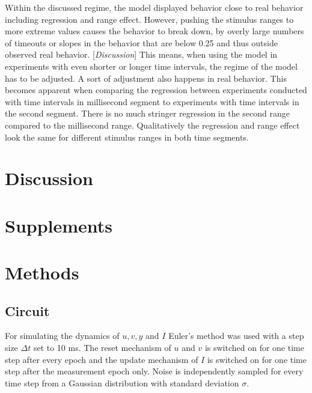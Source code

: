 \documentclass[10pt]{article}
\begin{document}
Within the discussed regime, the model displayed behavior close to real behavior including regression and range effect. However, pushing the stimulus ranges to more extreme values causes the behavior to break down, by overly large numbers of timeouts or slopes in the behavior that are below 0.25 and thus outside observed real behavior. 
[\textit{Discussion}] This means, when using the model in experiments with even shorter or longer time intervals, the regime of the model has to be adjusted. 
A sort of adjustment also happens in real behavior. This becomes apparent when comparing the regression between experiments conducted with time intervals in millisecond segment to experiments with time intervals in the second segment. There is no much stringer regression in the second range compared to the millisecond range. Qualitatively the regression and range effect look the same for different stimulus ranges in both time segments. 

\section{Discussion}


\pagebreak

\setcounter{section}{0}
\section*{Supplements}
\setcounter{figure}{0}
\setcounter{table}{0}
\setcounter{equation}{0} 
\renewcommand{\figurename}{Supplementary Figure}
\renewcommand{\tablename}{Supplementary Table}

\section{Methods}
\subsection*{Circuit}
For simulating the dynamics of $u, v, y$ and $I$ Euler's method was used with a step size $\Delta t$ set to 10 ms.
The reset mechanism of $u$ and $v$ is switched on for one time step after every epoch and the update mechanism of $I$ is switched on for one time step after the measurement epoch only.
Noise is independently sampled for every time step from a Gaussian distribution with standard deviation $\sigma$.
\end{document}
